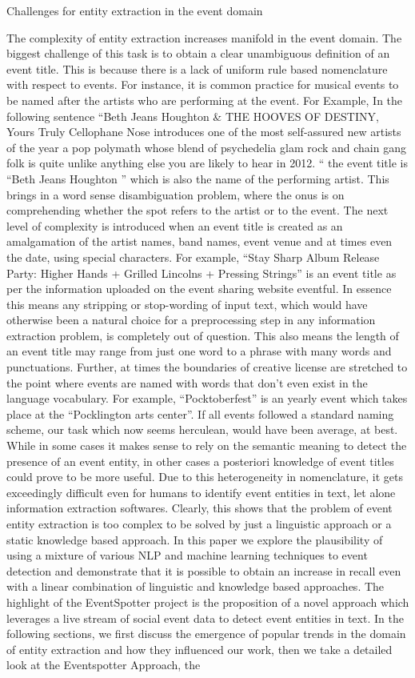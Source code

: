 \documentclass[a4paper,11pt]{report}
\begin{document}
\begin{table}[ht]
Challenges for entity extraction in the event domain 

The complexity of entity extraction increases manifold in the event domain. The biggest challenge of this task is to obtain a clear unambiguous definition of an event title. This is because there is a lack of uniform rule based nomenclature with respect to events. For instance, it is common practice for musical events to be named after the artists who are performing at the event.  For Example, In the following sentence  “Beth Jeans Houghton & THE HOOVES OF DESTINY,  Yours Truly Cellophane Nose introduces one of the most self-assured new artists of the year a pop polymath whose blend of psychedelia glam rock and chain gang folk is quite unlike anything else you are likely to hear in 2012. “ the event title is “Beth Jeans Houghton ” which is also the name of the performing artist. This brings in a word sense disambiguation problem, where the onus is on comprehending whether the spot refers to the artist or to the event. The next level of complexity is introduced when an event title is created as an amalgamation of the artist names, band names, event venue and at times even the date, using special characters. For example, “Stay Sharp Album Release Party: Higher Hands + Grilled Lincolns + Pressing Strings” is an event title as per the information uploaded on the event sharing website eventful.  In essence this means any stripping or stop-wording of input text, which would have otherwise been a natural choice for a preprocessing step in any information extraction problem, is completely out of question. This also means the length of an event title may range from just one word to a phrase with many words and punctuations. Further, at times the boundaries of creative license are stretched to the point where events are named with words that don’t even exist in the language vocabulary. For example, “Pocktoberfest” is an yearly event which takes place at the “Pocklington arts center”. If all events followed a standard naming scheme, our task which now seems herculean, would have been average, at best. While in some cases it makes sense to rely on the semantic meaning to detect the presence of an event entity, in other cases a posteriori knowledge of event titles could prove to be more useful.  Due to this heterogeneity in nomenclature, it gets exceedingly difficult even for humans to identify event entities in text, let alone information extraction softwares.  Clearly, this shows that the problem of event entity extraction is too complex to be solved by just a linguistic approach or a static knowledge based approach. In this paper we explore the plausibility of using a mixture of various NLP and machine learning techniques to event detection and demonstrate that it is possible to obtain an increase in recall even with a linear combination of linguistic and knowledge based approaches. The highlight of the EventSpotter project is the proposition of a novel approach which leverages a live stream of social event data to detect event entities in text. In the following sections, we first discuss the emergence of popular trends in the domain of entity extraction and how they influenced our work, then we take a detailed look at the Eventspotter Approach, the 
\end{table}
\end{document}
